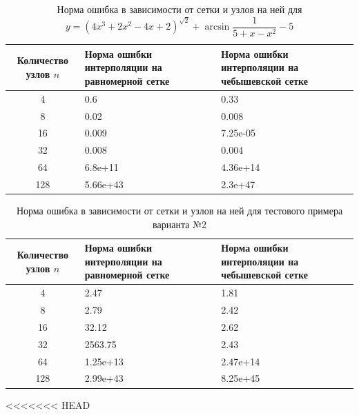 \documentclass{article}
\begin{document}
    \begin{table}[H]
        \centering
        \caption{Норма ошибка в зависимости от сетки и узлов на ней для $y = (4x^3 + 2x^2 - 4x + 2 )^{\sqrt{2}} + \arcsin{\dfrac{1}{5+x - x^2}} - 5$}
        \begin{tabular}{|c|p{5cm}|p{5cm}|}
            \hline
            Количество узлов $n$ & Норма ошибки интерполяции
            на равномерной сетке & Норма ошибки интерполяции
            на чебышевской сетке \\
            \hline 
            4 &  0.6 &  0.33 \\ \hline
            8 &  0.02 & 0.008\\ \hline
            16 &0.009 & 7.25e-05\\ \hline
            32 & 0.008 & 0.004\\ \hline
            64 & 6.8e+11 & 4.36e+14\\ \hline
            128 & 5.66e+43&  2.3e+47\\ \hline
        \end{tabular}
    \end{table}
    \begin{table}[H]
        \centering
        \caption{Норма ошибка в зависимости от сетки и узлов на ней для тестового примера варианта №2}
        \begin{tabular}{|c|p{5cm}|p{5cm}|}
            \hline
            Количество узлов $n$ & Норма ошибки интерполяции
            на равномерной сетке & Норма ошибки интерполяции
            на чебышевской сетке \\
            \hline 
            4 & 2.47 &  1.81 \\ \hline
            8 & 2.79 & 2.42\\ \hline
            16 &32.12 & 2.62\\ \hline
            32 & 2563.75 & 2.43\\ \hline
            64 &1.25e+13 & 2.47e+14\\ \hline
            128 & 2.99e+43&  8.25e+45\\ \hline
        \end{tabular}
    \end{table}
<<<<<<< HEAD
\end{document}
